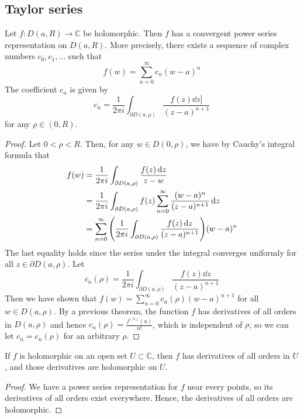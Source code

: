 \subsection{Taylor series}
\begin{theorem}
	Let \( f \colon D(a,R) \to \mathbb C \) be holomorphic.
	Then \( f \) has a convergent power series representation on \( D(a,R) \).
	More precisely, there exists a sequence of complex numbers \( c_0, c_1, \dots \) such that
	\[ f(w) = \sum_{n=0}^\infty c_n (w-a)^n \]
	The coefficient \( c_n \) is given by
	\[ c_n = \frac{1}{2\pi i} \int_{\partial D(a,\rho)} \frac{f(z) \dd{z]}}{(z-a)^{n+1}} \]
	for any \( \rho \in (0,R) \).
\end{theorem}
\begin{proof}
	Let \( 0 < \rho < R \).
	Then, for any \( w \in D(0,\rho) \), we have by Cauchy's integral formula that
	\begin{align*}
		f(w) &= \frac{1}{2\pi i}\int_{\partial D(a,\rho)} \frac{f(z) \dd{z}}{z-w} \\
		&= \frac{1}{2\pi i}\int_{\partial D(a,\rho)} f(z) \sum_{n=0}^\infty \frac{(w-a)^n}{(z-a)^{n+1}} \dd{z} \\
		&= \sum_{n=0}^\infty \qty( \frac{1}{2\pi i}\int_{\partial D(a,\rho)} \frac{f(z) \dd{z}}{(z-a)^{n+1}} ) (w-a)^n \\
	\end{align*}
	The last equality holds since the series under the integral converges uniformly for all \( z \in \partial D(a,\rho) \).
	Let
	\[ c_n(\rho) = \frac{1}{2\pi i} \int_{\partial D(a,\rho)} \frac{f(z) \dd{z}}{(z-a)^{n+1}} \]
	Then we have shown that \( f(w) = \sum_{n=0}^\infty c_n(\rho)(w-a)^{n+1} \) for all \( w \in D(a,\rho) \).
	By a previous theorem, the function \( f \) has derivatives of all orders in \( D(a,\rho) \) and hence \( c_n(\rho) = \frac{f^{(n)}(a)}{n!} \), which is independent of \( \rho \), so we can let \( c_n = c_n(\rho) \) for an arbitrary \( \rho \).
\end{proof}
\begin{corollary}
	If \( f \) is holomorphic on an open set \( U \subset \mathbb C \), then \( f \) has derivatives of all orders in \( U \), and those derivatives are holomorphic on \( U \).
\end{corollary}
\begin{proof}
	We have a power series representation for \( f \) near every points, so its derivatives of all orders exist everywhere.
	Hence, the derivatives of all orders are holomorphic.
\end{proof}
